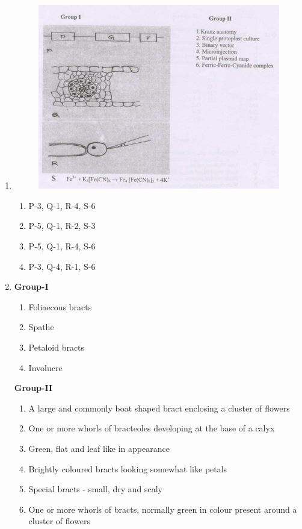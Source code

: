 \documentclass[journal,12pt,onecolumn]{IEEEtran}
\begin{document}
\begin{enumerate}
\item \begin{figure}[h!]
    \centering
    \includegraphics[width=0.9\linewidth]{FIG/M-16.png}
    \caption*{}
    \label{fig:M-16}
\end{figure}
\begin{multicols}{2}
\begin{enumerate}[label=\Alph*)]
    \item P-3, Q-1, R-4, S-6
    \item P-5, Q-1, R-2, S-3
    \item P-5, Q-1, R-4, S-6
    \item P-3, Q-4, R-1, S-6
\end{enumerate}
\end{multicols}
\item
\begin{multicols}{2}
\textbf{Group-I}
\begin{enumerate}[label=(\Alph*) ,start=16]
    \item Foliaecous bracts
    \item Spathe
    \item Petaloid bracts
    \item Involucre
\end{enumerate}

\columnbreak

\textbf{Group-II}
\begin{enumerate}[label=\arabic*]
    \item A large and commonly boat shaped bract enclosing a cluster of flowers
    \item One or more whorls of bracteoles developing at the base of a calyx
    \item Green, flat and leaf like in appearance
    \item Brightly coloured bracts looking somewhat like petals
    \item Special bracts - small, dry and scaly
    \item One or more whorls of bracts, normally green in colour present around a cluster of flowers
\end{enumerate}
\end{multicols}


\end{enumerate}
\end{document}
